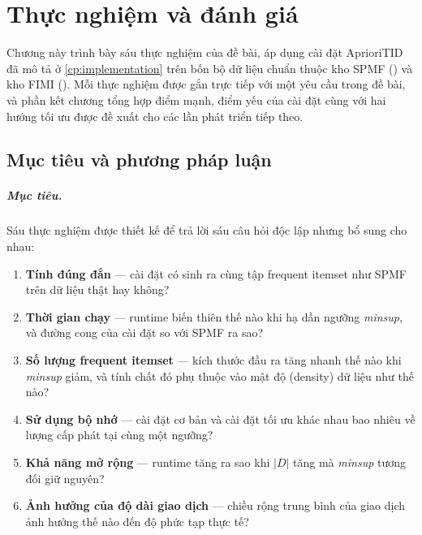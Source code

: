 \chapter[Thực nghiệm và đánh giá]{Thực nghiệm và đánh giá}
\label{cp:experiment-evaluation}

Chương này trình bày sáu thực nghiệm của đề bài, áp dụng cài đặt AprioriTID đã mô tả ở \autoref{cp:implementation} trên bốn bộ dữ liệu chuẩn thuộc kho SPMF (\cite{FournierViger2014SPMF}) và kho FIMI (\cite{Goethals2003FIMI}). Mỗi thực nghiệm được gắn trực tiếp với một yêu cầu trong đề bài, và phần kết chương tổng hợp điểm mạnh, điểm yếu của cài đặt cùng với hai hướng tối ưu được đề xuất cho các lần phát triển tiếp theo.

\section{Mục tiêu và phương pháp luận}
\label{sec:exp-method}

\paragraph{Mục tiêu.} Sáu thực nghiệm được thiết kế để trả lời sáu câu hỏi độc lập nhưng bổ sung cho nhau:
\begin{enumerate}
    \item[(a)] \textbf{Tính đúng đắn} --- cài đặt có sinh ra cùng tập frequent itemset như SPMF trên dữ liệu thật hay không?
    \item[(b)] \textbf{Thời gian chạy} --- runtime biến thiên thế nào khi hạ dần ngưỡng \textit{minsup}, và đường cong của cài đặt so với SPMF ra sao?
    \item[(c)] \textbf{Số lượng frequent itemset} --- kích thước đầu ra tăng nhanh thế nào khi \textit{minsup} giảm, và tính chất đó phụ thuộc vào mật độ (density) dữ liệu như thế nào?
    \item[(d)] \textbf{Sử dụng bộ nhớ} --- cài đặt cơ bản và cài đặt tối ưu khác nhau bao nhiêu về lượng cấp phát tại cùng một ngưỡng?
    \item[(e)] \textbf{Khả năng mở rộng} --- runtime tăng ra sao khi $|D|$ tăng mà \textit{minsup} tương đối giữ nguyên?
    \item[(f)] \textbf{Ảnh hưởng của độ dài giao dịch} --- chiều rộng trung bình của giao dịch ảnh hưởng thế nào đến độ phức tạp thực tế?
\end{enumerate}

